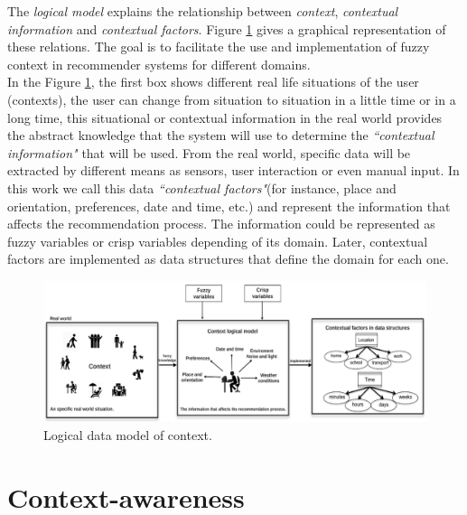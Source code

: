 The \textit{logical model} explains the relationship between \textit{context},
\textit{contextual information} and \textit{contextual factors}. 
Figure  \ref{fig:logicalmodel} gives a graphical representation of these relations. 
The goal is to facilitate the use and implementation of fuzzy context 
in recommender systems for different domains.\\
In the Figure  \ref{fig:logicalmodel}, the first box shows different
real life situations of the user (contexts), the user can change from situation
to situation in a little time or in a long time, this situational or
contextual information in the real world provides the abstract knowledge that
the system will use to determine the \textit{``contextual information"} that will 
be used. 
From the real world, specific data will be extracted by different means as
sensors, user interaction or even manual input. In this work 
we call this data \textit{``contextual factors"}(for instance, place and
orientation, preferences, date and time, etc.) and represent the
information that affects the recommendation process. The information
could be represented as fuzzy variables or crisp variables depending of
its domain. Later, contextual factors are implemented as data
structures that define the domain for each one. 
\begin{figure}
\captionsetup{font=footnotesize} \centering
\includegraphics[width=1.0\textwidth]{img/context-scheme.png}  
\small
\caption{Logical data model of context.}
\label{fig:logicalmodel}    
\end{figure} %

\section{Context-awareness} \label{context-awareness}

